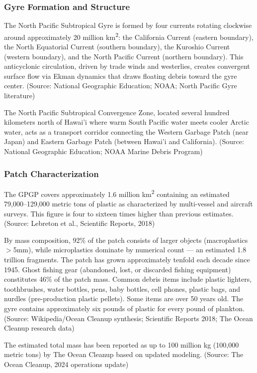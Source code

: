 \documentclass[11pt,letterpaper]{article}
\begin{document}
\subsubsection{Gyre Formation and Structure}
The North Pacific Subtropical Gyre is formed by four currents rotating clockwise around approximately 20 million km\textsuperscript{2}: the California Current (eastern boundary), the North Equatorial Current (southern boundary), the Kuroshio Current (western boundary), and the North Pacific Current (northern boundary). This anticyclonic circulation, driven by trade winds and westerlies, creates convergent surface flow via Ekman dynamics that draws floating debris toward the gyre center. (Source: National Geographic Education; NOAA; North Pacific Gyre literature)

The North Pacific Subtropical Convergence Zone, located several hundred kilometers north of Hawai'i where warm South Pacific water meets cooler Arctic water, acts as a transport corridor connecting the Western Garbage Patch (near Japan) and Eastern Garbage Patch (between Hawai'i and California). (Source: National Geographic Education; NOAA Marine Debris Program)

\subsubsection{Patch Characterization}
The GPGP covers approximately 1.6 million km\textsuperscript{2} containing an estimated 79,000--129,000 metric tons of plastic as characterized by multi-vessel and aircraft surveys. This figure is four to sixteen times higher than previous estimates. (Source: Lebreton et al., Scientific Reports, 2018)

By mass composition, 92\% of the patch consists of larger objects (macroplastics $>$5mm), while microplastics dominate by numerical count --- an estimated 1.8 trillion fragments. The patch has grown approximately tenfold each decade since 1945. Ghost fishing gear (abandoned, lost, or discarded fishing equipment) constitutes 46\% of the patch mass. Common debris items include plastic lighters, toothbrushes, water bottles, pens, baby bottles, cell phones, plastic bags, and nurdles (pre-production plastic pellets). Some items are over 50 years old. The gyre contains approximately six pounds of plastic for every pound of plankton. (Source: Wikipedia/Ocean Cleanup synthesis; Scientific Reports 2018; The Ocean Cleanup research data)

The estimated total mass has been reported as up to 100 million kg (100,000 metric tons) by The Ocean Cleanup based on updated modeling. (Source: The Ocean Cleanup, 2024 operations update)
\end{document}
